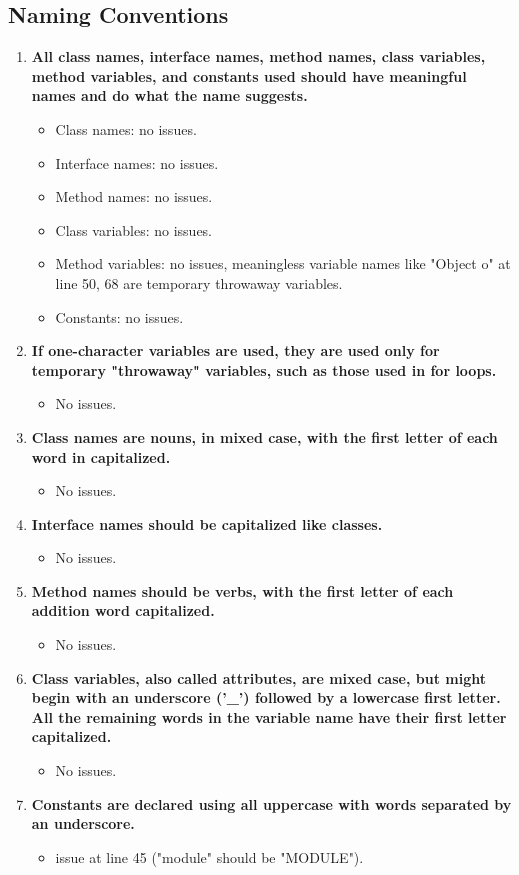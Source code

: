 \documentclass{article}
\begin{document}
		\subsection{Naming Conventions}
			\begin{enumerate}
				\item \textbf{All class names, interface names, method names, class variables, method variables, and constants used should have meaningful names and do what the name suggests.}
					\begin{itemize}
						\item Class names: no issues.
						\item Interface names: no issues.
						\item Method names: no issues.
						\item Class variables: no issues.
						\item Method variables: no issues, meaningless variable names like "Object o" at line 50, 68 are temporary throwaway variables.
						\item Constants: no issues.
					\end{itemize}
				\item \textbf{If one-character variables are used, they are used only for temporary "throwaway" variables, such as those used in for loops.}
					\begin{itemize}
						\item No issues.
					\end{itemize}
				\item \textbf{Class names are nouns, in mixed case, with the first letter of each word in capitalized.}
					\begin{itemize}
						\item No issues.
					\end{itemize}
				\item \textbf{Interface names should be capitalized like classes.}
					\begin{itemize}
						\item No issues.
					\end{itemize}
				\item \textbf{Method names should be verbs, with the first letter of each addition word capitalized.}
					\begin{itemize}
						\item No issues.
					\end{itemize}
				\item \textbf{Class variables, also called attributes, are mixed case, but might begin with an underscore ('\_') followed by a lowercase first letter. All the remaining words in the variable name have their first letter capitalized.}
					\begin{itemize}
						\item No issues.
					\end{itemize}
				\item \textbf{Constants are declared using all uppercase with words separated by an underscore.}
					\begin{itemize}
						\item issue at line 45 ("module" should be "MODULE").
					\end{itemize}
			\end{enumerate}
			\pagebreak
\end{document}
